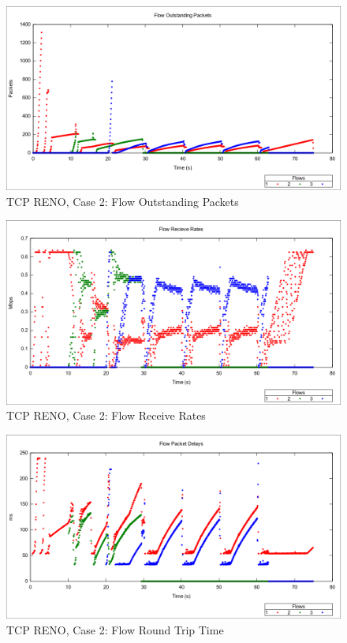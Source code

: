 \newpage
\clearpage


\begin{figure}[htbp]
    \centering
    \includegraphics[width=\textwidth]{reno2/Flow_Outstanding_Packets.png}
    \caption{TCP RENO, Case 2: Flow Outstanding Packets}
\end{figure}

\begin{figure}[htbp]
    \centering
    \includegraphics[width=\textwidth]{reno2/Flow_Receive_Rates.png}
    \caption{TCP RENO, Case 2: Flow Receive Rates }
\end{figure}


\begin{figure}[htbp]
    \centering
    \includegraphics[width=\textwidth]{reno2/Flow_RTT.png}
    \caption{TCP RENO, Case 2: Flow Round Trip Time}
\end{figure}

